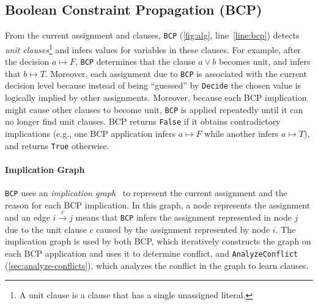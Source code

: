 \documentclass[oneside,11pt,dvipsnames]{book}
\numberwithin{equation}{section}
\theoremstyle{definition}
\theoremstyle{remark}
\newcommand{\tool}{\texttt{NeuralSAT}}
\begin{document}





\subsection{Boolean Constraint Propagation (BCP)}\label{sec:bcp}

From the current assignment and clauses, \texttt{BCP} (\autoref{fig:alg}, line~\ref{line:bcp}) detects \emph{unit clauses}\footnote{A unit clause is a clause that has a single unassigned literal.} and infers values for variables in these clauses.
For example, after the decision $a\mapsto F$, \texttt{BCP} determines that the clause $a\vee b$ becomes unit, and infers that $b \mapsto T$.
Moreover, each assignment due to \texttt{BCP} is associated with the current decision level because instead of being ``guessed'' by \texttt{Decide} the chosen value is logically implied by other assignments.
Moreover, because each {BCP} implication might cause other clauses to become unit, \texttt{BCP} is applied repeatedly until it can no longer find unit clauses.
\textsc{BCP} returns \texttt{False} if it obtains contradictory implications (e.g., one BCP application infers $a \mapsto F$ while another infers $a \mapsto T$), and returns \texttt{True} otherwise.

\paragraph{Implication Graph} \texttt{BCP} uses an \emph{implication graph}~\cite{barrett2013decision} to represent the current assignment and the reason for each BCP implication. In this graph, a node represents the assignment and an edge $i \xrightarrow{c} j$ means that \texttt{BCP} infers the assignment represented in node $j$ due to the unit clause $c$ caused by the assignment represented by node $i$.
The implication graph is used by both BCP, which iteratively constructs the graph on each BCP application and uses it to determine conflict, and \texttt{AnalyzeConflict} (\autoref{sec:analyze-conflicts}), which analyzes the conflict in the graph to learn clauses.
\end{document}
